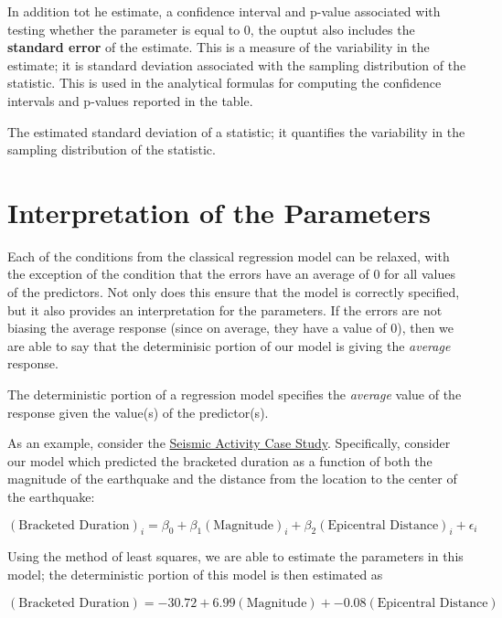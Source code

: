 \documentclass[]{book}
\theoremstyle{definition}
\theoremstyle{definition}
\theoremstyle{definition}
\theoremstyle{remark}
\let\BeginKnitrBlock\begin \let\EndKnitrBlock\end
\begin{document}
In addition tot he estimate, a confidence interval and p-value
associated with testing whether the parameter is equal to 0, the ouptut
also includes the \textbf{standard error} of the estimate. This is a
measure of the variability in the estimate; it is standard deviation
associated with the sampling distribution of the statistic. This is used
in the analytical formulas for computing the confidence intervals and
p-values reported in the table.

\BeginKnitrBlock{definition}[Standard Error]
\protect\hypertarget{def:defn-standard-error}{}{\label{def:defn-standard-error}
{} }The estimated standard deviation of a
statistic; it quantifies the variability in the sampling distribution of
the statistic.
\EndKnitrBlock{definition}

\section{Interpretation of the
Parameters}\label{interpretation-of-the-parameters}

Each of the conditions from the classical regression model can be
relaxed, with the exception of the condition that the errors have an
average of 0 for all values of the predictors. Not only does this ensure
that the model is correctly specified, but it also provides an
interpretation for the parameters. If the errors are not biasing the
average response (since on average, they have a value of 0), then we are
able to say that the determinisic portion of our model is giving the
\emph{average} response.

\BeginKnitrBlock{rmdkeyidea}
The deterministic portion of a regression model specifies the
\emph{average} value of the response given the value(s) of the
predictor(s).
\EndKnitrBlock{rmdkeyidea}

As an example, consider the \protect\hyperlink{CaseGreece}{Seismic
Activity Case Study}. Specifically, consider our model which predicted
the bracketed duration as a function of both the magnitude of the
earthquake and the distance from the location to the center of the
earthquake:

\[(\text{Bracketed Duration})_i = \beta_0 + \beta_1(\text{Magnitude})_i + \beta_2(\text{Epicentral Distance})_i + \epsilon_i\]

Using the method of least squares, we are able to estimate the
parameters in this model; the deterministic portion of this model is
then estimated as

\[(\text{Bracketed Duration}) = -30.72 + 6.99 (\text{Magnitude}) + -0.08(\text{Epicentral Distance})\]
\end{document}
